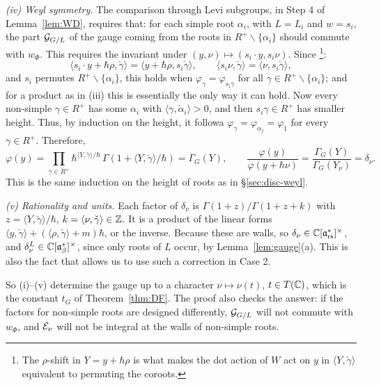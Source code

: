 \documentclass{article}
\theoremstyle{plain}
\theoremstyle{definition}
\theoremstyle{remark}
\numberwithin{equation}{section}
\begin{document}
\emph{(iv) Weyl symmetry.} The comparison through Levi subgroups, in Step 4 of Lemma~\ref{lem:WD}, requires that: for each simple root $\alpha_i$, with $L=L_i$ and $w=s_i$, the part $\mathcal G_{G/L}$ of the gauge coming from the roots in $R^+\smallsetminus\{\alpha_i\}$ should commute with $w_\Phi$. This requires the invariant under $(y,\nu)\mapsto(s_i\cdot y,s_i\nu)$. Since \footnote{The $\rho$-shift in $Y=y+\hbar\rho$ is what makes the dot action of $W$ act on $y$ in $\langle Y,\check\gamma\rangle$ equivalent to permuting the coroots.}:
\[
\langle s_i\cdot y+\hbar\rho,\check\gamma\rangle=\langle y+\hbar\rho,s_i\check\gamma\rangle,\qquad\langle s_i\nu,\check\gamma\rangle=\langle\nu,s_i\check\gamma\rangle,
\]
and $s_i$ permutes $R^+\smallsetminus\{\alpha_i\}$, this holds when $\varphi_\gamma=\varphi_{s_i\gamma}$ for all $\gamma\in R^+\smallsetminus\{\alpha_i\}$; and for a product as in (iii) this is essentially the only way it can hold. Now every non-simple $\gamma\in R^+$ has some $\alpha_i$ with $\langle\gamma,\check\alpha_i\rangle>0$, and then $s_i\gamma\in R^+$ has smaller height. Thus, by induction on the height, it followa $\varphi_\gamma=\varphi_{\alpha_j}=\varphi_1$ for every $\gamma\in R^+$. Therefore,
\[
\varphi(y)=\prod_{\gamma\in R^+}\hbar^{\langle Y,\check\gamma\rangle/\hbar}\,\Gamma(1+\langle Y,\check\gamma\rangle/\hbar)=\Gamma_G(Y),\qquad
\frac{\varphi(y)}{\varphi(y+\hbar\nu)}=\frac{\Gamma_G(Y)}{\Gamma_G(Y_\nu)}=\delta_\nu .
\]
This is the same induction on the height of roots as in \S\ref{sec:disc-weyl}.

\emph{(v) Rationality and units.} Each factor of $\delta_\nu$ is $\Gamma(1+z)/\Gamma(1+z+k)$ with $z=\langle Y,\check\gamma\rangle/\hbar$, $k=\langle\nu,\check\gamma\rangle\in\mathbb{Z}$. It is a product of the linear forms $\langle y,\check\gamma\rangle+(\langle\rho,\check\gamma\rangle+m)\hbar$, or the inverse. Because these are walls, so $\delta_\nu\in\mathbb{C}[\mathfrak{a}^*_{\mathrm{rs}}]^\times$, and $\delta^L_\nu\in\mathbb{C}[\mathfrak{a}^*_{\beta}]^\times$, since only roots of $L$ occur, by Lemma~\ref{lem:gauge}(a). This is also the fact that allows us to use such a correction in Case 2.

So (i)--(v) determine the gauge up to a character $\nu\mapsto\nu(t)$, $t\in T(\mathbb{C})$, which is the constant $t_G$ of Theorem~\ref{thm:DF}. The proof also checks the answer: if the factors for non-simple roots are designed differently, $\mathcal G_{G/L}$ will not commute with $w_\Phi$,  and $\mathcal E_\nu$ will not be integral at the walls of non-simple roots.
\end{document}

